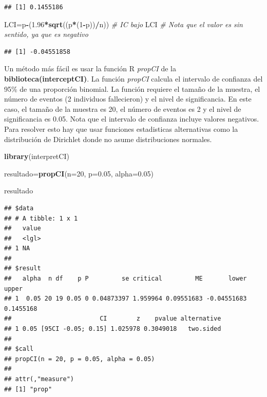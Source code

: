 \documentclass[
]{book}
\newenvironment{Shaded}{\begin{snugshade}}{\end{snugshade}}
\newcommand{\AttributeTok}[1]{\textcolor[rgb]{0.13,0.29,0.53}{#1}}
\newcommand{\CommentTok}[1]{\textcolor[rgb]{0.56,0.35,0.01}{\textit{#1}}}
\newcommand{\DecValTok}[1]{\textcolor[rgb]{0.00,0.00,0.81}{#1}}
\newcommand{\FloatTok}[1]{\textcolor[rgb]{0.00,0.00,0.81}{#1}}
\newcommand{\FunctionTok}[1]{\textcolor[rgb]{0.13,0.29,0.53}{\textbf{#1}}}
\newcommand{\NormalTok}[1]{#1}
\newcommand{\OtherTok}[1]{\textcolor[rgb]{0.56,0.35,0.01}{#1}}
\newcommand{\SpecialCharTok}[1]{\textcolor[rgb]{0.81,0.36,0.00}{\textbf{#1}}}
\theoremstyle{definition}
\theoremstyle{definition}
\theoremstyle{definition}
\theoremstyle{definition}
\theoremstyle{remark}
\begin{document}
\begin{verbatim}
## [1] 0.1455186
\end{verbatim}

\begin{Shaded}
\begin{Highlighting}[]
\NormalTok{LCI}\OtherTok{=}\NormalTok{p}\SpecialCharTok{{-}}\NormalTok{(}\FloatTok{1.96}\SpecialCharTok{*}\FunctionTok{sqrt}\NormalTok{((p}\SpecialCharTok{*}\NormalTok{(}\DecValTok{1}\SpecialCharTok{{-}}\NormalTok{p))}\SpecialCharTok{/}\NormalTok{n)) }\CommentTok{\# IC bajo}
\NormalTok{LCI }\CommentTok{\# Nota que el valor es sin sentido, ya que es negativo}
\end{Highlighting}
\end{Shaded}

\begin{verbatim}
## [1] -0.04551858
\end{verbatim}

Un método más fácil es usar la función R \emph{propCI} de la \textbf{biblioteca(interceptCI)}. La función \emph{propCI} calcula el intervalo de confianza del 95\% de una proporción binomial. La función requiere el tamaño de la muestra, el número de eventos (2 individuos fallecieron) y el nivel de significancia. En este caso, el tamaño de la muestra es 20, el número de eventos es 2 y el nivel de significancia es 0.05. Nota que el intervalo de confianza incluye valores negativos. Para resolver esto hay que usar funciones estadisticas alternativas como la distribución de Dirichlet donde no asume distribuciones normales.

\begin{Shaded}
\begin{Highlighting}[]
\FunctionTok{library}\NormalTok{(interpretCI)}

\NormalTok{resultado}\OtherTok{=}\FunctionTok{propCI}\NormalTok{(}\AttributeTok{n=}\DecValTok{20}\NormalTok{, }\AttributeTok{p=}\FloatTok{0.05}\NormalTok{, }\AttributeTok{alpha=}\FloatTok{0.05}\NormalTok{)}

\NormalTok{resultado}
\end{Highlighting}
\end{Shaded}

\begin{verbatim}
## $data
## # A tibble: 1 x 1
##   value
##   <lgl>
## 1 NA   
## 
## $result
##   alpha  n df    p P         se critical         ME       lower     upper
## 1  0.05 20 19 0.05 0 0.04873397 1.959964 0.09551683 -0.04551683 0.1455168
##                        CI        z    pvalue alternative
## 1 0.05 [95CI -0.05; 0.15] 1.025978 0.3049018   two.sided
## 
## $call
## propCI(n = 20, p = 0.05, alpha = 0.05)
## 
## attr(,"measure")
## [1] "prop"
\end{verbatim}
\end{document}
